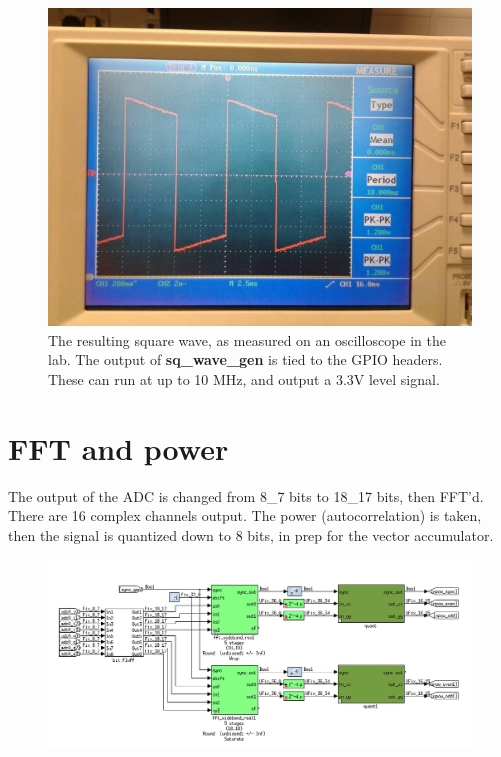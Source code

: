 \documentclass[letterpaper,10pt,english]{sphinxmanual}
\begin{document}
\begin{figure}[htbp]
\centering
\capstart

\includegraphics{nar_sq_wave.jpg}
\caption{The resulting square wave, as measured on an oscilloscope in the lab. The output of
\textbf{sq\_wave\_gen} is tied to the GPIO headers. These can run at up to 10 MHz, and output
a 3.3V level signal.}\end{figure}


\section{FFT and power}
\label{noise_diode:fft-and-power}
The output of the ADC is changed from 8\_7 bits to 18\_17 bits, then FFT'd.
There are 16 complex channels output. The power (autocorrelation) is taken,
then the signal is quantized down to 8 bits, in prep for the vector accumulator.
\begin{figure}[htbp]
\centering

\includegraphics{fluff_fft_quant.png}
\end{figure}
\end{document}

